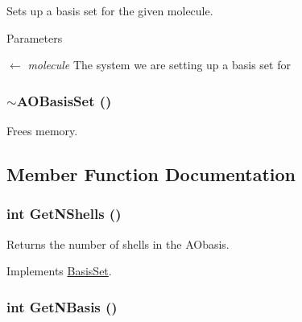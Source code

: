 Sets up a basis set for the given molecule. 
\begin{DoxyParams}{Parameters}
\item[\mbox{$\leftarrow$} {\em molecule}]The system we are setting up a basis set for \end{DoxyParams}
\hypertarget{classJKBuilder_1_1AOBasisSet_addb5212a040850c3a3816eb2ef9c2483}{
\subsubsection[{$\sim$AOBasisSet}]{\setlength{\rightskip}{0pt plus 5cm}$\sim${\bf AOBasisSet} ()}}
\label{classJKBuilder_1_1AOBasisSet_addb5212a040850c3a3816eb2ef9c2483}


Frees memory. 

\subsection{Member Function Documentation}
\hypertarget{classJKBuilder_1_1AOBasisSet_aa62be7e63d0f2b5828ab72cec3ce8590}{
\subsubsection[{GetNShells}]{\setlength{\rightskip}{0pt plus 5cm}int GetNShells ()}}
\label{classJKBuilder_1_1AOBasisSet_aa62be7e63d0f2b5828ab72cec3ce8590}


Returns the number of shells in the AObasis. 

Implements \hyperlink{classJKBuilder_1_1BasisSet_a0eb3b46d258dffcfbc3e4db91f60f4f8}{BasisSet}.\hypertarget{classJKBuilder_1_1AOBasisSet_a297c144fb990284ac5973c99cdd55f91}{
\subsubsection[{GetNBasis}]{\setlength{\rightskip}{0pt plus 5cm}int GetNBasis ()}}
\label{classJKBuilder_1_1AOBasisSet_a297c144fb990284ac5973c99cdd55f91}


